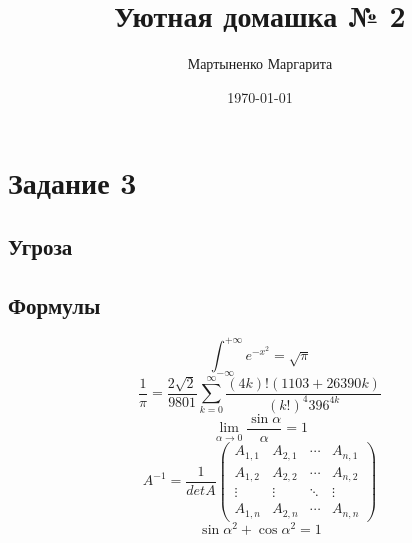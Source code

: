 \documentclass[12pt, a4paper]{article}
\author{Мартыненко Маргарита}
\title{Уютная домашка № 2}
\date{\today}
\begin{document}
\maketitle
\newpage
\section{Задание 3}
\subsection{Угроза}
\begin{center}
\end{center}
\subsection{Формулы}
 \begin{equation}  \int_{-\infty}^{+\infty} e^{-x^{2}} = \sqrt{\pi} \end{equation}
 \begin{equation}  \frac{1}{\pi} = \frac{2\sqrt{2}}{9801}\sum_{k=0}^{\infty} \frac{(4k)!(1103+26390k)}{(k!)^4 396^{4k}} \end{equation}
 \begin{equation}  \lim_{\alpha \to 0} \frac{\sin{\alpha}}{\alpha} = 1 \end{equation}
\begin{equation}  A^{-1}= \frac{1}{detA} \begin{pmatrix} 
 A_{1,1} & A_{2,1} & \cdots & A_{n,1} \\
  A_{1,2} & A_{2,2} & \cdots & A_{n,2} \\
  \vdots  & \vdots  & \ddots & \vdots  \\
  A_{1,n} & A_{2,n} & \cdots & A_{n,n}
\end{pmatrix} 
\end{equation}
 \begin{equation}  \sin{\alpha}^2 + \cos{\alpha}^2 =1   \end{equation}
\end{document}
